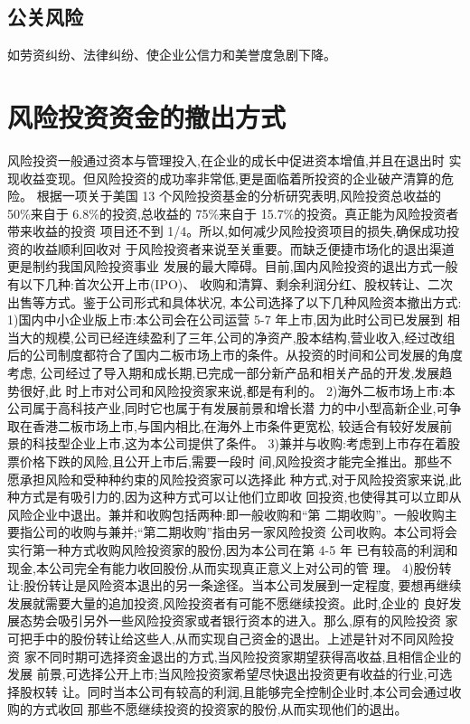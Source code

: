 \subsection{公关风险}
如劳资纠纷、法律纠纷、使企业公信力和美誉度急剧下降。

\section{风险投资资金的撤出方式}
风险投资一般通过资本与管理投入,在企业的成长中促进资本增值,并且在退出时
实现收益变现。但风险投资的成功率非常低,更是面临着所投资的企业破产清算的危险。
根据一项关于美国 13 个风险投资基金的分析研究表明,风险投资总收益的 50\%来自于
6.8\%的投资,总收益的 75\%来自于 15.7\%的投资。真正能为风险投资者带来收益的投资
项目还不到 1/4。所以,如何减少风险投资项目的损失,确保成功投资的收益顺利回收对
于风险投资者来说至关重要。而缺乏便捷市场化的退出渠道更是制约我国风险投资事业
发展的最大障碍。目前,国内风险投资的退出方式一般有以下几种:首次公开上市(IPO)、
收购和清算、剩余利润分红、股权转让、二次出售等方式。鉴于公司形式和具体状况,
本公司选择了以下几种风险资本撤出方式:
1)国内中小企业版上市:本公司会在公司运营 5-7 年上市,因为此时公司已发展到
相当大的规模,公司已经连续盈利了三年,公司的净资产,股本结构,营业收入,经过改组
后的公司制度都符合了国内二板市场上市的条件。从投资的时间和公司发展的角度考虑,
公司经过了导入期和成长期,已完成一部分新产品和相关产品的开发,发展趋势很好,此
时上市对公司和风险投资家来说,都是有利的。
2)海外二板市场上市:本公司属于高科技产业,同时它也属于有发展前景和增长潜
力的中小型高新企业,可争取在香港二板市场上市,与国内相比,在海外上市条件更宽松,
较适合有较好发展前景的科技型企业上市,这为本公司提供了条件。
3)兼并与收购:考虑到上市存在着股票价格下跌的风险,且公开上市后,需要一段时
间,风险投资才能完全推出。那些不愿承担风险和受种种约束的风险投资家可以选择此
种方式,对于风险投资家来说,此种方式是有吸引力的,因为这种方式可以让他们立即收
回投资,也使得其可以立即从风险企业中退出。兼并和收购包括两种:即一般收购和“第
二期收购”。一般收购主要指公司的收购与兼并;“第二期收购”指由另一家风险投资
公司收购。本公司将会实行第一种方式收购风险投资家的股份,因为本公司在第 4-5 年
已有较高的利润和现金,本公司完全有能力收回股份,从而实现真正意义上对公司的管
理。
4)股份转让:股份转让是风险资本退出的另一条途径。当本公司发展到一定程度,
要想再继续发展就需要大量的追加投资,风险投资者有可能不愿继续投资。此时,企业的
良好发展态势会吸引另外一些风险投资家或者银行资本的进入。那么,原有的风险投资
家可把手中的股份转让给这些人,从而实现自己资金的退出。上述是针对不同风险投资
家不同时期可选择资金退出的方式,当风险投资家期望获得高收益,且相信企业的发展
前景,可选择公开上市;当风险投资家希望尽快退出投资更有收益的行业,可选择股权转
让。同时当本公司有较高的利润,且能够完全控制企业时,本公司会通过收购的方式收回
那些不愿继续投资的投资家的股份,从而实现他们的退出。
